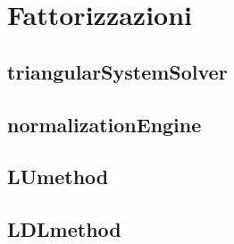 \section{Fattorizzazioni}
\subsection{triangularSystemSolver}


\subsection{normalizationEngine}


\subsection{LUmethod}
\label{subsection:LUmethod}


\subsection{LDLmethod}
\label{subsection:LDLmethod}
